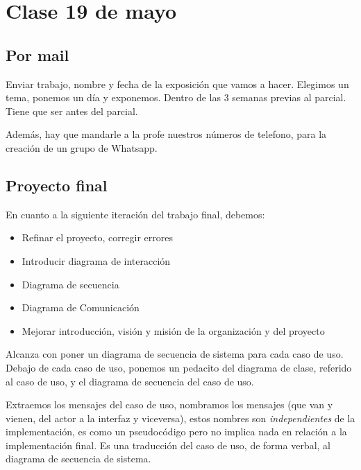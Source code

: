 \section{Clase 19 de mayo}

\subsection{Por mail}

Enviar trabajo, nombre y fecha de la exposición que vamos a hacer.
Elegimos un tema, ponemos un día y exponemos.
Dentro de las 3 semanas previas al parcial.
Tiene que ser antes del parcial.

Además,
hay que mandarle a la profe nuestros números de telefono,
para la creación de un grupo de Whatsapp.

\subsection{Proyecto final}

En cuanto a la siguiente iteración del trabajo final,
debemos:
\begin{itemize}
    \item Refinar el proyecto, corregir errores
    \item Introducir diagrama de interacción
    \item Diagrama de secuencia
    \item Diagrama de Comunicación
    \item Mejorar introducción, visión y misión de la organización y del proyecto 
\end{itemize}

Alcanza con poner un diagrama de secuencia de sistema para cada caso de uso.
Debajo de cada caso de uso,
ponemos un pedacito del diagrama de clase,
referido al caso de uso,
y el diagrama de secuencia del caso de uso.

Extraemos los mensajes del caso de uso,
nombramos los mensajes (que van y vienen, del actor a la interfaz y viceversa),
estos nombres son \textit{independientes} de la implementación,
es como un pseudocódigo pero no implica nada en relación a la implementación final.
Es una traducción del caso de uso,
de forma verbal,
al diagrama de secuencia de sistema.
